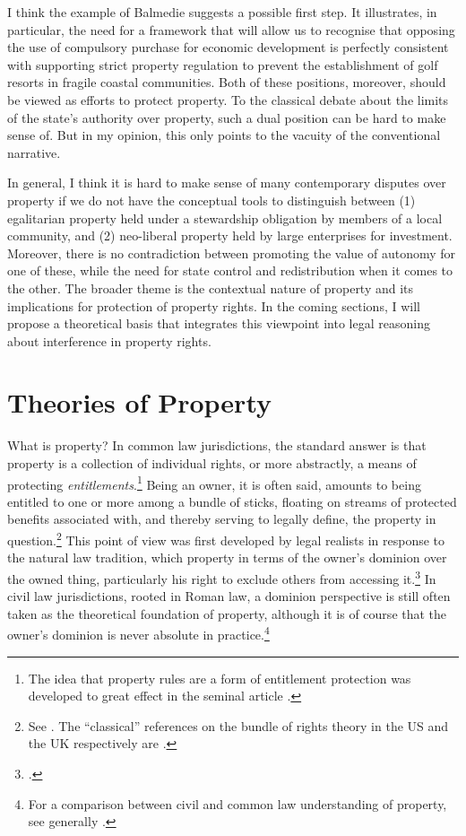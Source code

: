 I think the example of Balmedie suggests a possible first step. It illustrates, in particular, the need for a framework that will allow us to recognise that opposing the use of compulsory purchase for economic development is perfectly consistent with supporting strict property regulation to prevent the establishment of golf resorts in fragile coastal communities. Both of these positions, moreover, should be viewed as efforts to protect property. To the classical debate about the limits of the state's authority over property, such a dual position can be hard to make sense of. But in my opinion, this only points to the vacuity of the conventional narrative.

In general, I think it is hard to make sense of many contemporary disputes over property if we do not have the conceptual tools to distinguish between (1) egalitarian property held under a stewardship obligation by members of a local community, and (2) neo-liberal property held by large enterprises for investment. Moreover, there is no contradiction between promoting the value of autonomy for one of these, while  the need for state control and redistribution when it comes to the other. The broader theme is the contextual nature of property and its implications for protection of property rights. In the coming sections, I will propose a theoretical basis that integrates this viewpoint into legal reasoning about interference in property rights.

\section{Theories of Property}\label{sec:2:3}

What is property? In common law jurisdictions, the standard answer is that property is a collection of individual rights, or more abstractly, a means of protecting {\it entitlements}.\footnote{The idea that property rules are a form of entitlement protection was developed to great effect in the seminal article \cite{calabresi72}.} Being an owner, it is often said, amounts to being entitled to one or more among a bundle of sticks, floating on streams of protected benefits associated with, and thereby serving to legally define, the property in question.\footnote{See \cite[357-358]{merrill01}. The ``classical'' references on the bundle of rights theory in the US and the UK respectively are \cite{hohfeld17,honore61}.} This point of view was first developed by legal realists in response to the natural law tradition, which  property in terms of the owner's dominion over the owned thing, particularly his right to exclude others from accessing it.\footcite[193-195]{klein11} In civil law jurisdictions, rooted in Roman law, a dominion perspective is still often taken as the theoretical foundation of property, although it is of course  that the owner's dominion is never absolute in practice.\footnote{For a comparison between civil and common law understanding of property, see generally \cite{chang12}.}

